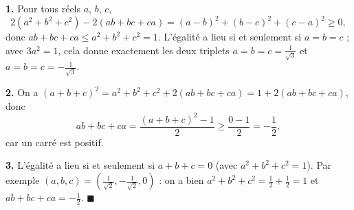 \textbf{1.} Pour tous réels $a$, $b$, $c$,
\[
2(a^2 + b^2 + c^2) - 2(ab + bc + ca) = (a-b)^2 + (b-c)^2 + (c-a)^2 \geqslant 0,
\]
donc $ab + bc + ca \leqslant a^2 + b^2 + c^2 = 1$. L'égalité a lieu si et
seulement si $a = b = c$ ; avec $3a^2 = 1$, cela donne exactement les deux
triplets $a = b = c = \frac{1}{\sqrt3}$ et $a = b = c = -\frac{1}{\sqrt3}$.

\textbf{2.} On a $(a+b+c)^2 = a^2 + b^2 + c^2 + 2(ab+bc+ca) = 1 + 2(ab+bc+ca)$, donc
\[
ab + bc + ca = \frac{(a+b+c)^2 - 1}{2} \geqslant \frac{0 - 1}{2} = -\frac12 ,
\]
car un carré est positif.

\textbf{3.} L'égalité a lieu si et seulement si $a + b + c = 0$ (avec
$a^2 + b^2 + c^2 = 1$). Par exemple $(a, b, c) = \left(\frac{1}{\sqrt2}, -\frac{1}{\sqrt2}, 0\right)$ :
on a bien $a^2 + b^2 + c^2 = \frac12 + \frac12 = 1$ et
$ab + bc + ca = -\frac12$. \hfill $\blacksquare$
